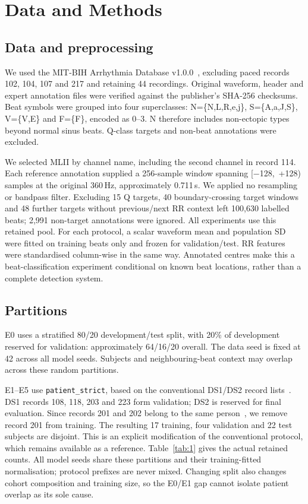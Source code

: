 \documentclass[10pt,a4paper]{article}
\begin{document}
\section{Data and Methods}

\subsection{Data and preprocessing}

We used the MIT-BIH Arrhythmia Database v1.0.0~\cite{moody2005mitbih}, excluding paced records 102, 104, 107 and 217 and retaining 44 recordings. Original waveform, header and expert annotation files were verified against the publisher's SHA-256 checksums. Beat symbols were grouped into four superclasses: N=\{N,L,R,e,j\}, S=\{A,a,J,S\}, V=\{V,E\} and F=\{F\}, encoded as 0--3. N therefore includes non-ectopic types beyond normal sinus beats. Q-class targets and non-beat annotations were excluded.

We selected MLII by channel name, including the second channel in record 114. Each reference annotation supplied a 256-sample window spanning [−128,~+128) samples at the original 360\,Hz, approximately 0.711\,s. We applied no resampling or bandpass filter. Excluding 15 Q targets, 40 boundary-crossing target windows and 48 further targets without previous/next RR context left 100,630 labelled beats; 2,991 non-target annotations were ignored. All experiments use this retained pool. For each protocol, a scalar waveform mean and population SD were fitted on training beats only and frozen for validation/test. RR features were standardised column-wise in the same way. Annotated centres make this a beat-classification experiment conditional on known beat locations, rather than a complete detection system.

\subsection{Partitions}

E0 uses a stratified 80/20 development/test split, with 20\% of development reserved for validation: approximately 64/16/20 overall. The data seed is fixed at 42 across all model seeds. Subjects and neighbouring-beat context may overlap across these random partitions.

E1--E5 use \texttt{patient\_strict}, based on the conventional DS1/DS2 record lists~\cite{dechazal2004automatic}. DS1 records 108, 118, 203 and 223 form validation; DS2 is reserved for final evaluation. Since records 201 and 202 belong to the same person~\cite{moody2005mitbih}, we remove record 201 from training. The resulting 17 training, four validation and 22 test subjects are disjoint. This is an explicit modification of the conventional protocol, which remains available as a reference. Table~\ref{tab:1} gives the actual retained counts. All model seeds share these partitions and their training-fitted normalisation; protocol prefixes are never mixed. Changing split also changes cohort composition and training size, so the E0/E1 gap cannot isolate patient overlap as its sole cause.
\end{document}
